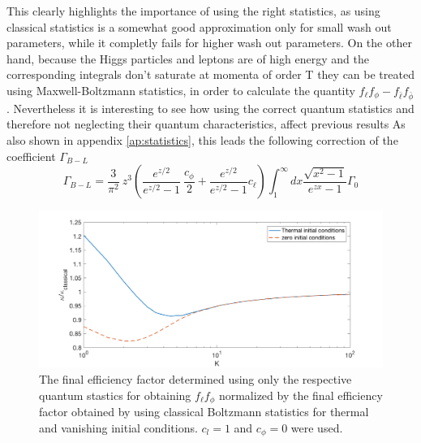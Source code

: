 This clearly highlights the importance of using the right statistics, as using classical statistics is a somewhat good approximation only for small wash out parameters, while it completly fails for higher wash out parameters.\newline \indent
On the other hand, because the Higgs particles and leptons are of high energy and the corresponding integrals don't saturate at momenta of order T they can be treated using Maxwell-Boltzmann statistics, in order to calculate the quantity $f_\ell f_\phi-f_{\bar{\ell}}f_{\bar{\phi}}$. Nevertheless it is interesting to see how using the correct quantum statistics and therefore not neglecting their quantum characteristics, affect previous results
As also shown in appendix \ref{ap:statistics}, this leads the following correction of the coefficient $\Gamma_{B-L}$
\begin{equation}
\Gamma_{B-L}=\frac{3}{\pi^2}\:z^3\left(\frac{e^{z/2}}{e^{z/2}-1}\:\frac{c_\phi}{2}+\frac{e^{z/2}}{e^{z/2}-1}c_\ell\right)\int_{1}^{\infty}dx\frac{\sqrt{x^2-1}}{e^{zx}-1}\Gamma_0
\label{eq:B-L_corrected}
\end{equation}
\begin{figure}[H]
	\centering
	\includegraphics[width=0.8\linewidth]{Images/quantum1}
	\caption{The final efficiency factor determined using only the respective quantum stastics for obtaining $f_\ell f_\phi$ normalized by the final efficiency factor obtained by using classical Boltzmann statistics for thermal and vanishing initial conditions. $c_l=1$ and $c_\phi=0$ were used.}
	\label{fig:quantum1}
\end{figure} \noindent
